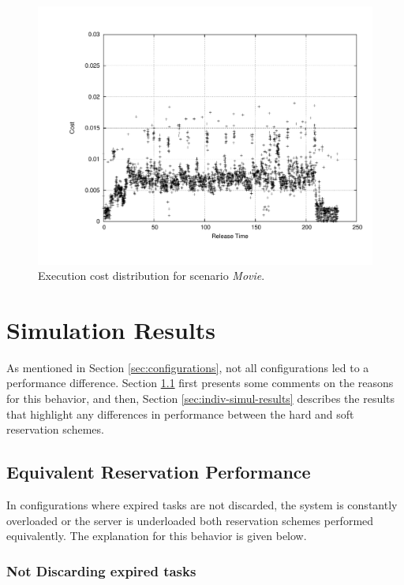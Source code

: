 \documentclass[12pt]{article}
\newcommand{\Lquatro}{\textit{Movie}}
\begin{document}
\begin{figure}[h!t]
  \centering
  \includegraphics[scale=0.26]{trace-eve}
  \caption{Execution cost distribution for scenario \Lquatro{}.}
  \label{fig:plotl4}
\end{figure}

\section{Simulation Results}
\label{sec:simulation-results}

As mentioned in Section \ref{sec:configurations}, not all
configurations led to a performance difference. Section
\ref{sec:noDifference} first presents some comments on the reasons for
this behavior, and then, Section \ref{sec:indiv-simul-results}
describes the results that highlight any differences in performance
between the hard and soft reservation schemes.

\subsection{Equivalent Reservation Performance}
\label{sec:noDifference}

In configurations where expired tasks are not discarded, the system is
constantly overloaded or the server is underloaded both reservation
schemes performed equivalently. The explanation for this behavior is
given below.

\subsubsection{Not Discarding expired tasks}
\label{sec:disc-expir-tasks}
\end{document}

